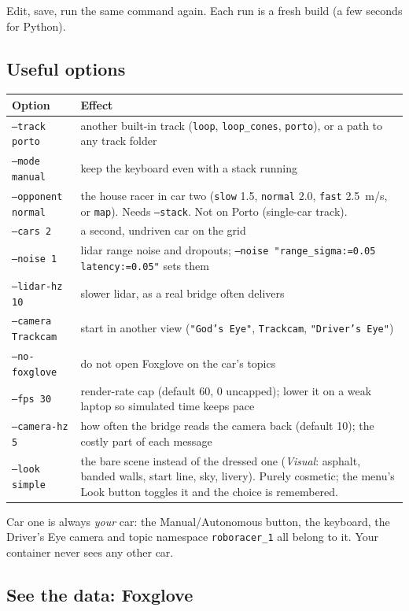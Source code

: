 \documentclass[11pt,a4paper]{article}
\begin{document}
Edit, save, run the same command again. Each run is a fresh build (a few seconds for Python).

\subsection{Useful options}

\begin{tabularx}{\linewidth}{lX}
\toprule
Option & Effect\\
\midrule
\texttt{--track porto} & another built-in track (\texttt{loop}, \texttt{loop\_cones}, \texttt{porto}), or a path to any track folder\\
\texttt{--mode manual} & keep the keyboard even with a stack running\\
\texttt{--opponent normal} & the house racer in car two (\texttt{slow} 1.5, \texttt{normal} 2.0, \texttt{fast} 2.5~m/s, or \texttt{map}). Needs \texttt{--stack}. Not on Porto (single-car track).\\
\texttt{--cars 2} & a second, undriven car on the grid\\
\texttt{--noise 1} & lidar range noise and dropouts; \texttt{--noise "range\_sigma:=0.05 latency:=0.05"} sets them\\
\texttt{--lidar-hz 10} & slower lidar, as a real bridge often delivers\\
\texttt{--camera Trackcam} & start in another view (\texttt{"God's Eye"}, \texttt{Trackcam}, \texttt{"Driver's Eye"})\\
\texttt{--no-foxglove} & do not open Foxglove on the car's topics\\
\texttt{--fps 30} & render-rate cap (default 60, 0 uncapped); lower it on a weak laptop so simulated time keeps pace\\
\texttt{--camera-hz 5} & how often the bridge reads the camera back (default 10); the costly part of each message\\
\texttt{--look simple} & the bare scene instead of the dressed one (\emph{Visual}: asphalt, banded walls, start line, sky, livery). Purely cosmetic; the menu's Look button toggles it and the choice is remembered.\\
\bottomrule
\end{tabularx}

Car one is always \emph{your} car: the Manual/Autonomous button, the keyboard, the Driver's
Eye camera and topic namespace \texttt{roboracer\_1} all belong to it. Your container never sees
any other car.

\subsection{See the data: Foxglove}\label{sec:foxglove}
\end{document}
